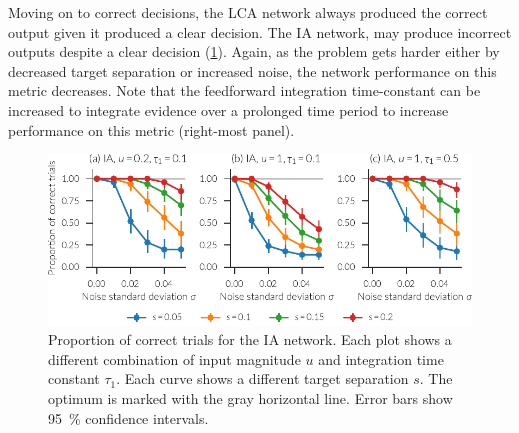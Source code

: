 Moving on to correct decisions, the LCA network always produced the correct output given it produced a clear decision.
The IA network, may produce incorrect outputs despite a clear decision (\cref{fig:ia-correct}).
Again, as the problem gets harder either by decreased target separation or increased noise, the network performance on this metric decreases.
Note that the feedforward integration time-constant can be increased to integrate evidence over a prolonged time period  to increase performance on this metric (right-most panel).
\begin{figure}
    \centering
    \includegraphics{figures/ia-correct}
    \caption[Proportion of correct trials for the IA network]{Proportion of correct trials for the IA network. Each plot shows a different combination of input magnitude $u$ and integration time constant $\tau_1$. Each curve shows a different target separation $s$. The optimum is marked with the gray horizontal line. Error bars show \SI{95}{\percent} confidence intervals.}\label{fig:ia-correct}
\end{figure}

